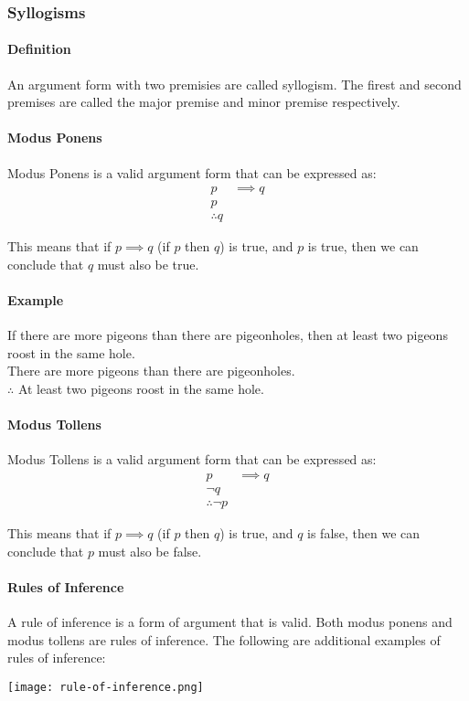 \pagebreak

\subsubsection*{Syllogisms}
\paragraph*{Definition}
An argument form with two premisies are called syllogism. The firest and second premises are called the 
major premise and minor premise respectively.

\paragraph*{Modus Ponens}
Modus Ponens is a valid argument form that can be expressed as:
\begin{align*}
    p &\implies q\\
    p &\\
    \therefore q &
\end{align*}

This means that if $p \implies q$ (if $p$ then $q$) is true, and $p$ is true, then we can conclude that $q$ must also be true.
\paragraph*{Example}
If there are more pigeons than there are pigeonholes, then at least two pigeons roost in the same hole.\\
There are more pigeons than there are pigeonholes.\\
$\therefore$ At least two pigeons roost in the same hole.

\paragraph*{Modus Tollens}
Modus Tollens is a valid argument form that can be expressed as:
\begin{align*}
    p &\implies q\\
    \neg q &\\
    \therefore \neg p &
\end{align*}

This means that if $p \implies q$ (if $p$ then $q$) is true, and $q$ is false, then we can conclude that $p$ must also be false.

\pagebreak

\paragraph*{Rules of Inference}
A rule of inference is a form of argument that is valid. Both modus ponens and modus tollens are rules of inference. The following 
are additional examples of rules of inference:
\begin{center}
    \texttt{[image: rule-of-inference.png]}
\end{center}